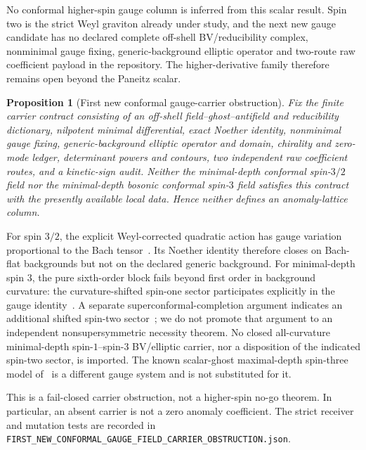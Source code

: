 \documentclass[11pt]{article}
\newtheorem{proposition}[theorem]{Proposition}
\theoremstyle{definition}
\theoremstyle{remark}
\begin{document}
No conformal higher-spin gauge column is inferred from this scalar result.
Spin two is the strict Weyl graviton already under study, and the next new
gauge candidate has no declared complete off-shell BV/reducibility complex,
nonminimal gauge fixing, generic-background elliptic operator and two-route
raw coefficient payload in the repository.  The higher-derivative family
therefore remains open beyond the Paneitz scalar.

\begin{proposition}[First new conformal gauge-carrier obstruction]
Fix the finite carrier contract consisting of an off-shell
field--ghost--antifield and reducibility dictionary, nilpotent minimal
differential, exact Noether identity, nonminimal gauge fixing,
generic-background elliptic operator and domain, chirality and zero-mode
ledger, determinant powers and contours, two independent raw coefficient
routes, and a kinetic-sign audit.  Neither the minimal-depth conformal
spin-\(3/2\) field nor the minimal-depth bosonic conformal spin-\(3\) field
satisfies this contract with the presently available local data.  Hence
neither defines an anomaly-lattice column.
\end{proposition}

For spin \(3/2\), the explicit Weyl-corrected quadratic action has gauge
variation proportional to the Bach tensor~\cite{KuzenkoPondsRaptakis,
KuzenkoPondsGeometry}.  Its Noether identity therefore closes on Bach-flat
backgrounds but not on the declared generic background.  For minimal-depth
spin \(3\), the pure sixth-order block fails beyond first order in background
curvature: the curvature-shifted spin-one sector participates explicitly in
the gauge identity~\cite{BeccariaTseytlinSpin13}.  A separate
superconformal-completion argument indicates an additional shifted
spin-two sector~\cite{KuzenkoPondsRaptakis}; we do not promote that argument
to an independent nonsupersymmetric necessity theorem.  No closed
all-curvature minimal-depth spin-\(1\)--spin-\(3\) BV/elliptic carrier, nor
a disposition of the indicated spin-two sector, is imported.  The known
scalar-ghost maximal-depth spin-three model
of~\cite{KuzenkoPondsGeneralised} is a different gauge system and is not
substituted for it.

This is a fail-closed carrier obstruction, not a higher-spin no-go theorem.
In particular, an absent carrier is not a zero anomaly coefficient.  The
strict receiver and mutation tests are recorded in
\texttt{FIRST\_NEW\_CONFORMAL\_GAUGE\_FIELD\_CARRIER\_OBSTRUCTION.json}.
\end{document}
